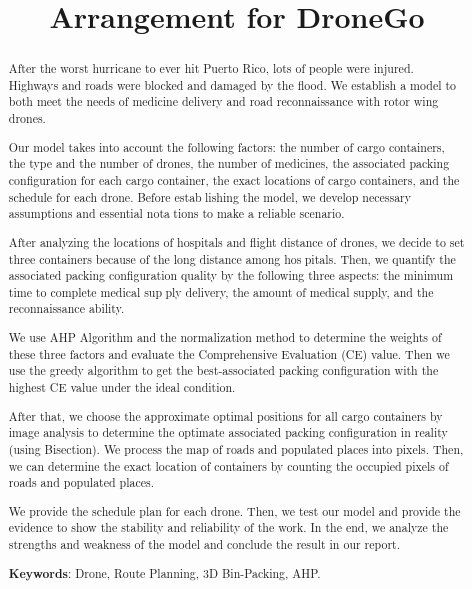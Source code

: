 \documentclass[12pt]{article}  %
\title{Arrangement for DroneGo}  %
\begin{document}
\begin{abstract}
    After the worst hurricane to ever hit Puerto Rico, lots of people were
    injured. Highways and roads were blocked and damaged by the flood. We
    establish a model to both meet the needs of medicine delivery and road
    reconnaissance with rotor wing drones.
    
    Our model takes into account the following factors: the number of cargo
    containers, the type and the number of drones, the number of medicines,
    the associated packing configuration for each cargo container, the exact locations of cargo containers, and the schedule for each drone. Before establishing the model, we develop necessary assumptions and essential notations to make a reliable scenario.
    
    After analyzing the locations of hospitals and flight distance of drones,
    we decide to set three containers because of the long distance among hospitals. Then, we quantify the associated packing configuration quality by
    the following three aspects: the minimum time to complete medical supply delivery, the amount of medical supply, and the reconnaissance ability.
   
    We use AHP Algorithm and the normalization method to determine the
    weights of these three factors and evaluate the Comprehensive Evaluation
    (CE) value. Then we use the greedy algorithm to get the best-associated
    packing configuration with the highest CE value under the ideal condition.
    
    After that, we choose the approximate optimal positions for all cargo
    containers by image analysis to determine the optimate associated packing
    configuration in reality (using Bisection). We process the map of roads and
    populated places into pixels. Then, we can determine the exact location of
    containers by counting the occupied pixels of roads and populated places.
    
    We provide the schedule plan for each drone. Then, we test our model
    and provide the evidence to show the stability and reliability of the work. In
    the end, we analyze the strengths and weakness of the model and conclude
    the result in our report.

     \vspace{5pt}
     \textbf{Keywords}: Drone, Route Planning, 3D Bin-Packing, AHP.

\end{abstract}
\end{document}
